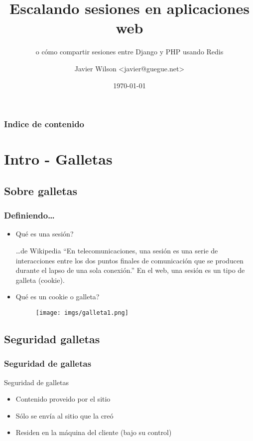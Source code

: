 \documentclass{beamer}
\begin{document}
\title{Escalando sesiones en aplicaciones web}
\subtitle{o cómo compartir sesiones entre Django y PHP usando Redis}
\author{Javier Wilson <javier@guegue.net>}
\date{\today}

\begin{frame}
\titlepage
\end{frame}

\begin{frame}\frametitle{Indice de contenido}\tableofcontents
\end{frame} 


\section{Intro - Galletas} 
\subsection{Sobre galletas} 
\begin{frame}\frametitle{Definiendo\ldots}
\begin{itemize}
\item Qué es una sesión?
\begin{block}{\ldots de Wikipedia}
``En telecomunicaciones, una sesión es una serie de interacciones entre los dos puntos finales de comunicación que se producen durante el lapso de una sola conexión.''  En el web, una sesión es un tipo de galleta (cookie). \pause
\end{block}
\item Qué es un cookie o galleta?
\begin{figure}
\texttt{[image: imgs/galleta1.png]}
\end{figure}
\end{itemize} 
\end{frame}

\subsection{Seguridad galletas} 
\begin{frame}\frametitle{Seguridad de galletas}
Seguridad de galletas
\begin{itemize}
\item Contenido proveido por el sitio \pause
\item Sólo se envía al sitio que la creó \pause
\item Residen en la máquina del cliente (bajo su control)
\end{itemize} 
\end{frame}
\end{document}
